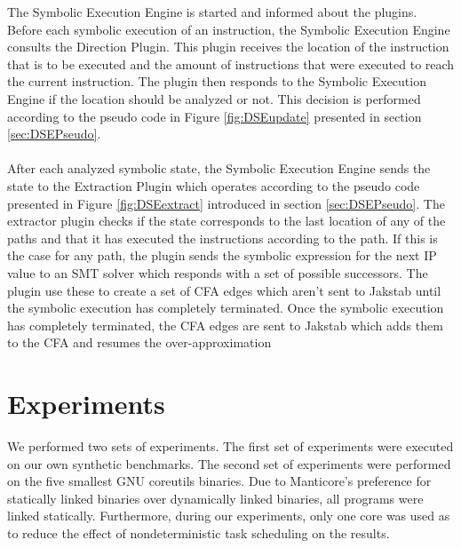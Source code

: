 \documentclass{kththesis}
\newcommand{\fbcomment}[1]{{#1}}
\renewcommand{\fbcomment}[1]{}
\begin{document}
\clearpage
\noindent
The Symbolic Execution Engine is started and informed about the plugins. Before each symbolic execution of an instruction, the Symbolic Execution Engine consults the Direction Plugin. This plugin receives the location of the instruction that is to be executed and the amount of instructions that were executed to reach the current instruction. The plugin then responds to the Symbolic Execution Engine if the location should be analyzed or not. This decision is performed according to the pseudo code in Figure \ref{fig:DSEupdate} presented in section \ref{sec:DSEPseudo}. 
\\ \\
After each analyzed symbolic state, the Symbolic Execution Engine sends the state to the Extraction Plugin which operates according to the pseudo code presented in Figure \ref{fig:DSEextract} introduced in section \ref{sec:DSEPseudo}. The extractor plugin checks if the state corresponds to the last location of any of the paths and that it has executed the instructions according to the path. If this is the case for any path, the plugin sends the symbolic expression for the next IP value to an SMT solver which responds with a set of possible successors. The plugin use these to create a set of CFA edges which aren't sent to Jakstab until the symbolic execution has completely terminated. Once the symbolic execution has completely terminated, the CFA edges are sent to Jakstab which adds them to the CFA and resumes the over-approximation
\section{Experiments}
\fbcomment{\color{red}Goal: Describe what experiments were done and why. Also, describe with enough details for the experiments to be reproducible}
We performed two sets of experiments. The first set of experiments were executed on our own synthetic benchmarks. The second set of experiments were performed on the five smallest GNU coreutils binaries. Due to Manticore's preference for statically linked binaries over dynamically linked binaries, all programs were linked statically. Furthermore, during our experiments, only one core was used as to reduce the effect of nondeterministic task scheduling on the results. 
\end{document}
